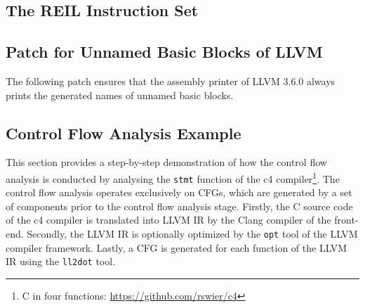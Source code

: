 
\clearpage


\subsection{The REIL Instruction Set}
\label{app:reil_instructions}



\clearpage


\subsection{Patch for Unnamed Basic Blocks of LLVM}
\label{app:unnamed_patch}

The following patch ensures that the assembly printer of LLVM 3.6.0 always prints the generated names of unnamed basic blocks.



\clearpage


\subsection{Control Flow Analysis Example}
\label{app:control_flow_analysis_example}

This section provides a step-by-step demonstration of how the control flow analysis is conducted by analysing the \texttt{stmt} function of the c4 compiler\footnote{C in four functions: \url{https://github.com/rswier/c4}}. The control flow analysis operates exclusively on CFGs, which are generated by a set of components prior to the control flow analysis stage. Firstly, the C source code of the c4 compiler is translated into LLVM IR by the Clang compiler of the front-end. Secondly, the LLVM IR is optionally optimized by the \texttt{opt} tool of the LLVM compiler framework. Lastly, a CFG is generated for each function of the LLVM IR using the \texttt{ll2dot} tool.

